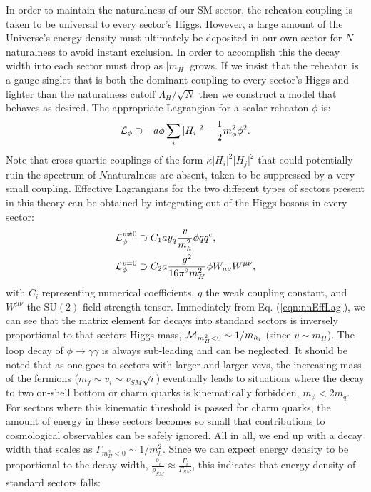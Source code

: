 \documentclass[nofootinbib,twocolumn,preprintnumbers]{revtex4-1}
\begin{document}
In order to maintain the naturalness of our SM sector, the reheaton coupling is taken to be universal to every sector's Higgs. However, a large amount of the Universe's energy density must ultimately be deposited in our own sector for $N$naturalness to avoid instant exclusion. In order to accomplish this the decay width into each sector must drop as $\vert m_H\vert$ grows. If we insist that the reheaton is a gauge singlet that is both the dominant coupling to every sector's Higgs and lighter than the naturalness cutoff $\Lambda_H/\sqrt{N}$ then we construct a model that behaves as desired. 
The appropriate Lagrangian for a scalar reheaton $\phi$ is: 
\begin{equation}\label{eqn:nnLagrangian}
{\cal L}_\phi \supset -a\phi\sum_i\vert H_i\vert^2 - \frac{1}{2}m^2_\phi \phi^2.
\end{equation}
Note that cross-quartic couplings of the form $\kappa\vert H_i\vert^2\vert H_j\vert^2$ that could potentially ruin the spectrum of $N$naturalness are absent, taken to be suppressed by a very small coupling. Effective Lagrangians for the two different types of sectors present in this theory can be obtained by integrating out of the Higgs bosons in every sector:
\begin{equation}\label{eqn:nnEffLag}
\begin{split}
{\cal L}_\phi^{v \neq 0} &\supset C_1 a y_q\frac{v}{m_h^2}\phi q q^c,
\\
{\cal L}_\phi^{v = 0} &\supset C_2 a \frac{g^2}{16\pi^2 m_H^2}\phi W_{\mu\nu}W^{\mu\nu},
\end{split}
\end{equation}
with $C_i$ representing numerical coefficients, $g$ the weak coupling constant, and $W^{\mu\nu}$ the SU$(2)$ field strength tensor.
Immediately from Eq. (\ref{eqn:nnEffLag}), we can see that the matrix element for decays into standard sectors is inversely proportional to that sectors Higgs mass, ${\cal M}_{m_H^2 < 0} \sim 1/m_{h_i}$ (since $v\sim m_H$). 
The loop decay of $\phi \rightarrow \gamma\gamma$ is always sub-leading and can be neglected. It should be noted that as one goes to sectors with larger and larger vevs, the increasing mass of the fermions ($m_f \sim v_i \sim v_{SM}\sqrt{i}$) eventually leads to situations where the decay to two on-shell bottom or charm quarks is kinematically forbidden, $m_\phi < 2 m_q$. For sectors where this kinematic threshold is passed for charm quarks, the amount of energy in these sectors becomes so small that contributions to cosmological observables can be safely ignored. All in all, we end up with a decay width that scales as $\Gamma_{m_H^2<0} \sim 1/m_h^2$. Since we can expect energy density to be proportional to the decay width, $\frac{\rho_i}{\rho_{SM}} \approx \frac{\Gamma_i}{\Gamma_{SM}}$, this indicates that energy density of standard sectors falls:
\end{document}
